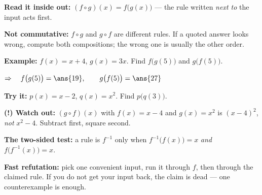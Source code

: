 \documentclass[12pt]{article}
\begin{document}


\begin{formulabox}
\textbf{Read it inside out:} $(f \circ g)(x) = f\bigl(g(x)\bigr)$ --- the rule written
\emph{next to} the input acts first.\par
\textbf{Not commutative:} $f \circ g$ and $g \circ f$ are different rules. If a quoted answer
looks wrong, compute both compositions; the wrong one is usually the other order.
\end{formulabox}

\begin{examplebox}
\textbf{Example:} \quad $f(x) = x + 4$, $g(x) = 3x$. Find $f\bigl(g(5)\bigr)$ and $g\bigl(f(5)\bigr)$.

$\Rightarrow\quad f\bigl(g(5)\bigr) = \ans{19}, \qquad g\bigl(f(5)\bigr) = \ans{27}$
\end{examplebox}

\begin{tryitbox}
\textbf{Try it:} \quad $p(x) = x - 2$, $q(x) = x^2$. Find $p\bigl(q(3)\bigr)$.\\[2pt]
\end{tryitbox}

\begin{watchoutbox}
\textbf{(!) Watch out:} $(g \circ f)(x)$ with $f(x) = x - 4$ and $g(x) = x^2$ is $(x-4)^2$, \emph{not} $x^2 - 4$. Subtract first, square second.
\end{watchoutbox}


\begin{formulabox}
\textbf{The two-sided test:} a rule is $f^{-1}$ only when $f^{-1}\bigl(f(x)\bigr) = x$
\emph{and} $f\bigl(f^{-1}(x)\bigr) = x$.\par
\textbf{Fast refutation:} pick one convenient input, run it through $f$, then through the
claimed rule. If you do not get your input back, the claim is dead --- one counterexample is
enough.
\end{formulabox}
\end{document}
